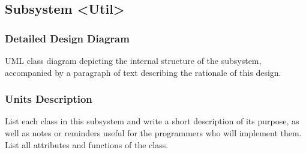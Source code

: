 \subsection{Subsystem <Util>}

\subsubsection{Detailed Design Diagram}

UML class diagram depicting the internal structure of the subsystem,
accompanied by a paragraph of text describing the rationale of this design.

\subsubsection{Units Description}

List each class in this subsystem and write a short description of its purpose,
as well as notes or reminders useful for the programmers who will implement them.
List all attributes and functions of the class.